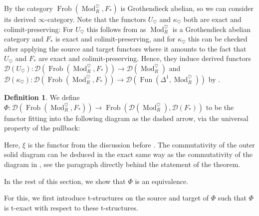 \documentclass{article}
\theoremstyle{definition}
\newtheorem{defn}{Definition}[section]
\theoremstyle{definition}
\theoremstyle{definition}
\theoremstyle{plain}
\theoremstyle{plain}
\theoremstyle{plain}
\theoremstyle{plain}
\theoremstyle{plain}
\theoremstyle{plain}
\theoremstyle{plain}
\theoremstyle{plain}
\theoremstyle{remark}
\theoremstyle{remark}
\theoremstyle{plain}
\theoremstyle{plain}
\theoremstyle{plain}
\theoremstyle{plain}
\theoremstyle{plain}
\newcommand{\id}[1]{\operatorname{id}_{#1}}
\newcommand{\cartsymb}{\arrow[dr, phantom,"\scalebox{1.5}{\color{black}$\lrcorner$}", near start, color=black]}
\newcommand{\ModDisc}[1]{\operatorname{Mod}_{#1}^{\heartsuit}}
\newcommand{\Frob}[2]{\operatorname{Frob}(#1, #2)}
\newcommand{\Cat}[1]{\mathcal{#1}}
\newcommand{\Fun}[2]{\operatorname{Fun}({#1},{#2})}
\begin{document}
By  the category $\Frob{\ModDisc{R}}{F_*}$ is Grothendieck abelian, so we can consider its derived $\infty$-category.
Note that the functors $U_\heartsuit$ and $\kappa_\heartsuit$ both are exact and colimit-preserving: For $U_\heartsuit$ this follows from \cite[Corollary 2.8 (i)]{cartmod} as $\ModDisc{R}$ is a Grothendieck abelian category and $F_*$ is exact and colimit-preserving, and for $\kappa_\heartsuit$ this can be checked after applying the source and target functors where it amounts to the fact that $U_\heartsuit$ and $F_*$ are exact and colimit-preserving.
Hence, they induce derived functors $\Cat D(U_\heartsuit)\colon \Cat D(\Frob{\ModDisc{R}}{F_*}) \to \Cat D(\ModDisc{R})$ and $\Cat D(\kappa_\heartsuit)\colon \Cat D(\Frob{\ModDisc{R}}{F_*}) \to \Cat D(\Fun{\Delta^1}{\ModDisc{R}})$ by \cite[Proposition A.2]{cartmod}.

\begin{defn}
    We define $\Phi \colon \Cat{D}(\Frob{\ModDisc{R}}{F_*}) \to \Frob{\Cat D(\ModDisc{R})}{\Cat D(F_*)}$
    to be the functor fitting into the following diagram as the dashed arrow, via the universal property of the pullback:
    \begin{center}
    \end{center}
    Here, $\xi$ is the functor from the discussion before \cite[Theorem 5.1]{cartmod}.
    The commutativity of the outer solid diagram can be deduced in the exact same way 
    as the commutativity of the diagram in \cite[Theorem 5.1]{cartmod}, 
    see the paragraph directly behind the statement of the theorem.
\end{defn}
In the rest of this section, we show that $\Phi$ is an equivalence.

For this, we first introduce t-structures on the source and target of $\Phi$ such that $\Phi$ is t-exact with respect to these t-structures.
\end{document}
